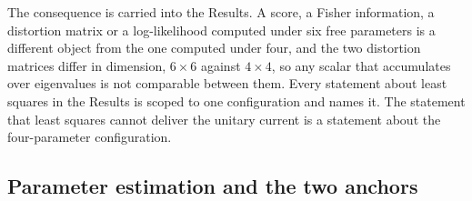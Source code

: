 The consequence is carried into the Results. A score, a Fisher information, a
distortion matrix or a log-likelihood computed under six free parameters is a
different object from the one computed under four, and the two distortion matrices
differ in dimension, $6\times 6$ against $4\times 4$, so any scalar that accumulates
over eigenvalues is not comparable between them. Every statement about least squares
in the Results is scoped to one configuration and names it. The statement that least
squares cannot deliver the unitary current is a statement about the four-parameter
configuration.

\subsection*{Parameter estimation and the two anchors}

